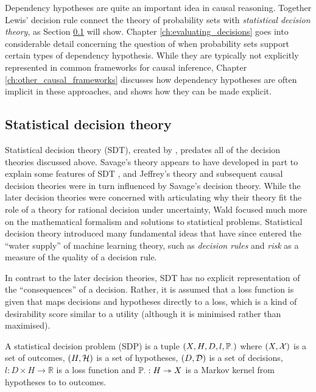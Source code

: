 Dependency hypotheses are quite an important idea in causal reasoning. Together Lewis' decision rule connect the theory of probability sets with \emph{statistical decision theory}, as Section \ref{sec:sdt} will show. Chapter \ref{ch:evaluating_decisions} goes into considerable detail concerning the question of when probability sets support certain types of dependency hypothesis. While they are typically not explicitly represented in common frameworks for causal inference, Chapter \ref{ch:other_causal_frameworks} discusses how dependency hypotheses are often implicit in these approaches, and shows how they can be made explicit.

\subsection{Statistical decision theory}\label{sec:sdt}

Statistical decision theory (SDT), created by \citet{wald_statistical_1950}, predates all of the decision theories discussed above. Savage's theory appears to have developed in part to explain some features of SDT \citet{savage_theory_1951}, and Jeffrey's theory and subsequent causal decision theories were in turn influenced by Savage's decision theory. While the later decision theories were concerned with articulating why their theory fit the role of a theory for rational decision under uncertainty, Wald focused much more on the mathematical formalism and solutions to statistical problems. Statistical decision theory introduced many fundamental ideas that have since entered the ``water supply'' of machine learning theory, such as \emph{decision rules} and \emph{risk} as a measure of the quality of a decision rule.

In contrast to the later decision theories, SDT has no explicit representation of the ``consequences'' of a decision. Rather, it is assumed that a loss function is given that maps decisions and hypotheses directly to a loss, which is a kind of desirability score similar to a utility (although it is minimised rather than maximised).

\begin{definition}
A statistical decision problem (SDP) is a tuple $(X, H, D, l, \mathbb{P}_\cdot)$ where $(X,\mathcal{X})$ is a set of outcomes, $(H,\mathcal{H})$ is a set of hypotheses, $(D,\mathcal{D})$ is a set of decisions, $l:D\times H\to \mathbb{R}$ is a loss function and $\mathbb{P}_\cdot:H\rightarrowtriangle X$ is a Markov kernel from hypotheses to to outcomes.
\end{definition}


